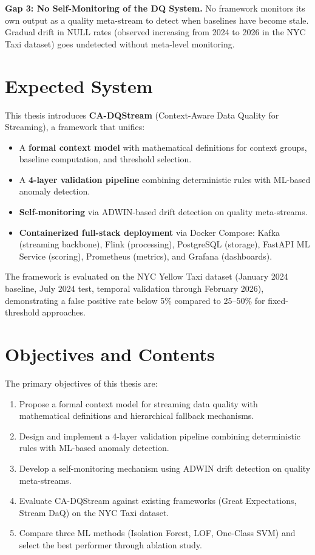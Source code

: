 \documentclass[a4paper, reqno, oneside]{book}
\begin{document}
\textbf{Gap 3: No Self-Monitoring of the DQ System.} No framework monitors its own output as a quality meta-stream to detect when baselines have become stale. Gradual drift in NULL rates (observed increasing from 2024 to 2026 in the NYC Taxi dataset) goes undetected without meta-level monitoring.

\section{Expected System}
This thesis introduces \textbf{CA-DQStream} (Context-Aware Data Quality for Streaming), a framework that unifies:
\begin{itemize}
    \item A \textbf{formal context model} with mathematical definitions for context groups, baseline computation, and threshold selection.
    \item A \textbf{4-layer validation pipeline} combining deterministic rules with ML-based anomaly detection.
    \item \textbf{Self-monitoring} via ADWIN-based drift detection on quality meta-streams.
    \item \textbf{Containerized full-stack deployment} via Docker Compose: Kafka (streaming backbone), Flink (processing), PostgreSQL (storage), FastAPI ML Service (scoring), Prometheus (metrics), and Grafana (dashboards).
\end{itemize}

The framework is evaluated on the NYC Yellow Taxi dataset (January 2024 baseline, July 2024 test, temporal validation through February 2026), demonstrating a false positive rate below 5\% compared to 25--50\% for fixed-threshold approaches.

\section{Objectives and Contents}
The primary objectives of this thesis are:

\begin{enumerate}
    \item Propose a formal context model for streaming data quality with mathematical definitions and hierarchical fallback mechanisms.
    \item Design and implement a 4-layer validation pipeline combining deterministic rules with ML-based anomaly detection.
    \item Develop a self-monitoring mechanism using ADWIN drift detection on quality meta-streams.
    \item Evaluate CA-DQStream against existing frameworks (Great Expectations, Stream DaQ) on the NYC Taxi dataset.
    \item Compare three ML methods (Isolation Forest, LOF, One-Class SVM) and select the best performer through ablation study.
\end{enumerate}
\end{document}
